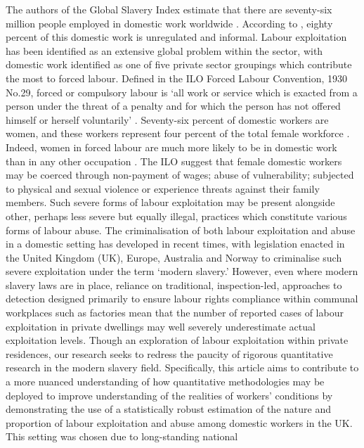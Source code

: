 \documentclass[
  12pt,
  letterpaper,
  DIV=11,
  numbers=noendperiod]{scrartcl}
\theoremstyle{plain}
\theoremstyle{definition}
\begin{document}
The authors of the Global Slavery Index estimate that there are
seventy-six million people employed in domestic work worldwide
\autocite{international_labour_organization_global_2022}.
According to \autocite{bonnet_domestic_2022}, eighty percent of this domestic work is unregulated and informal. Labour
exploitation has been identified as an extensive global problem within
the sector, with domestic work identified as one of five private sector
groupings which contribute the most to forced labour. Defined in the ILO
Forced Labour Convention, 1930 No.29, forced or compulsory labour is
`all work or service which is exacted from a person under the threat of
a penalty and for which the person has not offered himself or herself
voluntarily' \autocite{ilo_what_2024}. Seventy-six
percent of domestic workers are women, and these workers represent four
percent of the total female workforce \autocite{international_labour_organization_global_2022}. Indeed, women in forced labour are much more likely to be in domestic
work than in any other occupation \autocite{international_labour_organization_global_2022}.
The ILO suggest that female domestic workers may be coerced through
non-payment of wages; abuse of vulnerability; subjected to physical and
sexual violence or experience threats against their family members. Such
severe forms of labour exploitation may be present alongside other,
perhaps less severe but equally illegal, practices which constitute
various forms of labour abuse. The criminalisation of both labour
exploitation and abuse in a domestic setting has developed in recent
times, with legislation enacted in the United Kingdom (UK), Europe,
Australia and Norway to criminalise such severe exploitation under the
term `modern slavery.' However, even where modern slavery laws are in
place, reliance on traditional, inspection-led, approaches to detection
designed primarily to ensure labour rights compliance within communal
workplaces such as factories mean that the number of reported cases of
labour exploitation in private dwellings may well severely underestimate
actual exploitation levels. Though an exploration of labour exploitation within private residences, our research seeks to redress the paucity of rigorous quantitative research in the modern slavery field.  Specifically, this article aims to contribute to a more
nuanced understanding of how quantitative methodologies may be deployed to
improve understanding of the realities of workers' conditions by
demonstrating the use of a statistically robust estimation of the nature
and proportion of labour exploitation and abuse among domestic workers in the UK. This setting was chosen due to long-standing national
\end{document}
